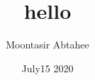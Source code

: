 \documentclass{book}
\begin{document}
\title{\Large{\textbf{hello}}}
\author{Moontasir Abtahee}
\date{July15 2020}
\maketitle
\end{document}
